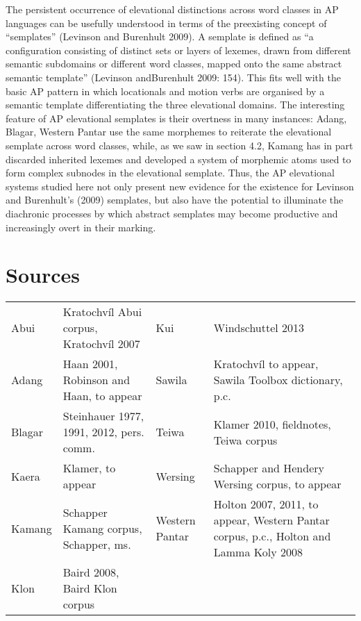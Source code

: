 The persistent occurrence of elevational distinctions across word classes in AP languages can be usefully understood in terms of the preexisting concept of {\textquotedblleft}semplates{\textquotedblright} (Levinson and Burenhult 2009). A semplate is defined as {\textquotedblleft}a configuration consisting of distinct sets or layers of lexemes, drawn from different semantic subdomains or different word classes, mapped onto the same abstract semantic template{\textquotedblright} (Levinson andBurenhult 2009: 154). This fits well with the basic AP pattern in which locationals and motion verbs are organised by a semantic template differentiating the three elevational domains. The interesting feature of AP elevational semplates is their overtness in many instances: Adang, Blagar, Western Pantar use the same morphemes to reiterate the elevational semplate across word classes, while, as we saw in section 4.2, Kamang has in part discarded inherited lexemes and developed a system of morphemic atoms used to form 
complex subnodes in the elevational semplate. Thus, the AP elevational systems studied here not only present new evidence for the existence for Levinson and Burenhult{\textquoteright}s (2009) semplates, but also have the potential to illuminate the diachronic processes by which abstract semplates may become productive and increasingly overt in their marking. 

\clearpage\section[Sources]{Sources}
\begin{flushleft}
\tablehead{}
\begin{supertabular}{m{0.8816598in}m{2.18866in}m{0.63655984in}m{2.1281598in}}
Abui &
Kratochv\'il Abui corpus, Kratochv\'il 2007 &
Kui &
Windschuttel 2013\\
Adang &
Haan 2001, Robinson and Haan, to appear &
Sawila &
Kratochv\'il to appear, Sawila Toolbox dictionary, p.c.\\
Blagar &
Steinhauer 1977, 1991, 2012, pers. comm. &
Teiwa &
Klamer 2010, fieldnotes, Teiwa corpus\\
Kaera &
Klamer, to appear  &
Wersing  &
Schapper and Hendery Wersing corpus, to appear\\
Kamang &
Schapper Kamang corpus, Schapper, ms. &
Western Pantar &
Holton 2007, 2011, to appear, Western Pantar corpus, p.c., Holton and Lamma Koly 2008\\
Klon &
Baird 2008, Baird Klon corpus &
 &
\\
\end{supertabular}
\end{flushleft}
